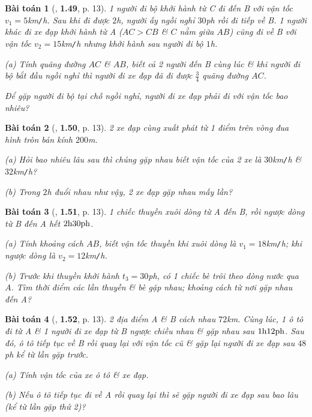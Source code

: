 \documentclass{article}
\numberwithin{equation}{section}
\newtheorem{baitoan}{Bài toán}[section]
\begin{document}
\begin{baitoan}[\cite{Van2022}, \textbf{1.49}, p. 13]
	1 người đi bộ khởi hành từ C đi đến B với vận tốc $v_1 = 5$\emph{km\texttt{/}h}. Sau khi đi được $2$\emph{h}, người ấy ngồi nghỉ $30$\emph{ph} rồi đi tiếp về B. 1 người khác đi xe đạp khởi hành từ A ($AC > CB$ \& $C$ nằm giữa $AB$) cũng đi về B với vận tốc $v_2 = 15$\emph{km\texttt{/}h} nhưng khởi hành sau người đi bộ $1$\emph{h}.
	\begin{enumerate*}
		\item[(a)] Tính quãng đường $AC$ \& $AB$, biết cả 2 người đến B cùng lúc \& khi người đi bộ bắt đầu ngồi nghỉ thì người đi xe đạp đã đi được $\frac{3}{4}$ quãng đường $AC$.
		\item Để gặp người đi bộ tại chỗ ngồi nghỉ, người đi xe đạp phải đi với vận tốc bao nhiêu?
	\end{enumerate*}
\end{baitoan}

\begin{baitoan}[\cite{Van2022}, \textbf{1.50}, p. 13]
	2 xe đạp cùng xuất phát từ 1 điểm trên vòng đua hình tròn bán kính $200$\emph{m}.
	\begin{enumerate*}
		\item[(a)] Hỏi bao nhiêu lâu sau thì chúng gặp nhau biết vận tốc của 2 xe là $30$\emph{km\texttt{/}h} \& $32$\emph{km\texttt{/}h}?
		\item[(b)] Trong $2$\emph{h} đuổi nhau như vậy, 2 xe đạp gặp nhau mấy lần?
	\end{enumerate*}
\end{baitoan}

\begin{baitoan}[\cite{Van2022}, \textbf{1.51}, p. 13]
	1 chiếc thuyền xuôi dòng từ A đến B, rồi ngược dòng từ B đến A hết $\rm 2h30ph$.
	\begin{enumerate*}
		\item[(a)] Tính khoảng cách $AB$, biết vận tốc thuyền khi xuôi dòng là $v_1 = 18$\emph{km\texttt{/}h}; khi ngược dòng là $v_2 = 12$\emph{km\texttt{/}h}.
		\item[(b)] Trước khi thuyền khởi hành $t_3 = 30$\emph{ph}, có 1 chiếc bè trôi theo dòng nước qua $A$. Tìm thời điểm các lần thuyền \& bè gặp nhau; khoảng cách từ nơi gặp nhau đến A?
	\end{enumerate*}
\end{baitoan}

\begin{baitoan}[\cite{Van2022}, \textbf{1.52}, p. 13]
	2 địa điểm A \& B cách nhau $72$\emph{km}. Cùng lúc, 1 ô tô đi từ A \& 1 người đi xe đạp từ B ngược chiều nhau \& gặp nhau sau $\rm 1h12ph$. Sau đó, ô tô tiếp tục về B rồi quay lại với vận tốc cũ \& gặp lại người đi xe đạp sau $48$\emph{ph} kể từ lần gặp trước.
	\begin{enumerate*}
		\item[(a)] Tính vận tốc của xe ô tô \& xe đạp.
		\item[(b)] Nếu ô tô tiếp tục đi về A rồi quay lại thì sẽ gặp người đi xe đạp sau bao lâu (kể từ lần gặp thứ 2)?
	\end{enumerate*}
\end{baitoan}
\end{document}
